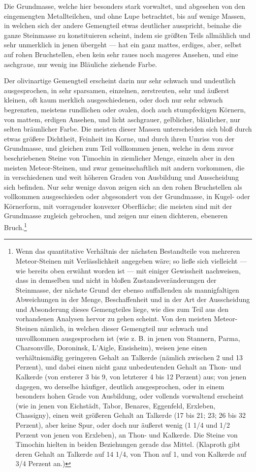 \documentclass[a4paper, 11pt, oneside, german]{article}
\begin{document}
Die Grundmasse, welche hier besonders stark vorwaltet, und abgesehen von den eingemengten Metallteilchen, und ohne Lupe betrachtet, bis auf wenige Massen, in welchen sich der andere Gemengteil etwas deutlicher ausspricht, beinahe die ganze Steinmasse zu konstituieren scheint, indem sie größten Teils allmählich und sehr unmerklich in jenen übergeht --- hat ein ganz mattes, erdiges, aber, selbst auf rohen Bruchstellen, eben kein sehr raues noch mageres Ansehen, und eine aschgraue, nur wenig ins Bläuliche ziehende Farbe.

Der olivinartige Gemengteil erscheint darin nur sehr schwach und undeutlich ausgesprochen, in sehr sparsamen, einzelnen, zerstreuten, sehr und äußerst kleinen, oft kaum merklich ausgeschiedenen, oder doch nur sehr schwach begrenzten, meistens rundlichen oder ovalen, doch auch stumpfeckigen Körnern, von mattem, erdigen Ansehen, und licht aschgrauer, gelblicher, bläulicher, nur selten bräunlicher Farbe. Die meisten dieser Massen unterscheiden sich bloß durch etwas größere Dichtheit, Feinheit im Korne, und durch ihren Umriss von der Grundmasse, und gleichen zum Teil vollkommen jenen, welche in dem zuvor beschriebenen Steine von Timochin in ziemlicher Menge, einzeln aber in den meisten Meteor-Steinen, und zwar gemeinschaftlich mit andern vorkommen, die in verschiedenen und weit höheren Graden von Ausbildung und Ausscheidung sich befinden. Nur sehr wenige davon zeigen sich an den rohen Bruchstellen als vollkommen ausgeschieden oder abgesondert von der Grundmasse, in Kugel- oder Körnerform, mit vorragender konvexer Oberfläche; die meisten sind mit der Grundmasse zugleich gebrochen, und zeigen nur einen dichteren, ebeneren Bruch.\footnote{Wenn das quantitative Verhältnis der nächsten Bestandteile von mehreren Meteor-Steinen mit Verlässlichkeit angegeben wäre; so ließe sich vielleicht --- wie bereits oben erwähnt worden ist --- mit einiger Gewissheit nachweisen, dass in demselben und nicht in bloßen Zustandsveränderungen der Steinmasse, der nächste Grund der ebenso auffallenden als mannigfaltigen Abweichungen in der Menge, Beschaffenheit und in der Art der Ausscheidung und Absonderung dieses Gemengteiles liege, wie dies zum Teil aus den vorhandenen Analysen hervor zu gehen scheint. Von den meisten Meteor-Steinen nämlich, in welchen dieser Gemengteil nur schwach und unvollkommen ausgesprochen ist (wie z. B. in jenen von Stannern, Parma, Charsonville, Doroninsk, L'Aigle, Ensisheim), weisen jene einen verhältnismäßig geringeren Gehalt an Talkerde (nämlich zwischen 2 und 13 Perzent), und dabei einen nicht ganz unbedeutenden Gehalt an Thon- und Kalkerde (von ersterer 3 bis 9, von letzterer 4 bis 12 Perzent) aus; von jenen dagegen, wo derselbe häufiger, deutlich ausgesprochen, oder in einem besonders hohen Grade von Ausbildung, oder vollends vorwaltend erscheint (wie in jenen von Eichstädt, Tabor, Benares, Eggenfeld, Erxleben, Chassigny), einen weit größeren Gehalt an Talkerde (17 bis 21; 23; 26 bis 32 Perzent), aber keine Spur, oder doch nur äußerst wenig (1 1/4 und 1/2 Perzent von jenen von Erxleben), an Thon- und Kalkerde. Die Steine von Timochin hielten in beiden Beziehungen gerade das Mittel. (Klaproth gibt deren Gehalt an Talkerde auf 14 1/4, von Thon auf 1, und von Kalkerde auf 3/4 Perzent an.)}
\end{document}
